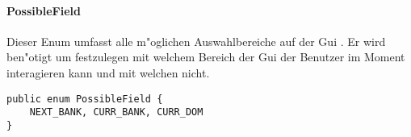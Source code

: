 \paragraph{PossibleField}
\label{par:possibleField}
Dieser Enum umfasst alle m"oglichen Auswahlbereiche auf der Gui . Er wird ben"otigt um festzulegen mit welchem Bereich der Gui der Benutzer im Moment interagieren kann und mit welchen nicht. 

\begin{lstlisting}[float,style=CodeHighlighting,caption=Enum - PossibleField,label=lst:possibleField]
public enum PossibleField {
    NEXT_BANK, CURR_BANK, CURR_DOM
}
\end{lstlisting}
